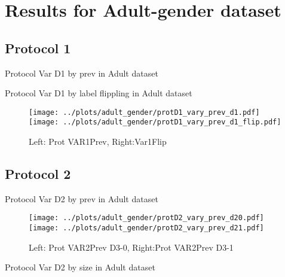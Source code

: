 \documentclass[10pt,a4paper]{article}
\begin{document}
\section{Results for Adult-gender dataset}

\subsection{Protocol 1}

\begin{table}[h!]
\small

\caption{Protocol Var D1 by prev in Adult dataset}
\end{table}

\begin{table}[h!]
\small

\caption{Protocol Var D1 by label flippling in Adult dataset}
\end{table}

\begin{figure}[h!]
\texttt{[image: ../plots/adult\_gender/protD1\_vary\_prev\_d1.pdf]}
\texttt{[image: ../plots/adult\_gender/protD1\_vary\_prev\_d1\_flip.pdf]}
\caption{Left: Prot VAR1Prev, Right:Var1Flip}
\end{figure}

\clearpage
\newpage
\subsection{Protocol 2}

\begin{table}[h!]
\small

\caption{Protocol Var D2 by prev in Adult dataset}
\end{table}

\begin{figure}[h!]
\texttt{[image: ../plots/adult\_gender/protD2\_vary\_prev\_d20.pdf]}
\texttt{[image: ../plots/adult\_gender/protD2\_vary\_prev\_d21.pdf]}
\caption{Left: Prot VAR2Prev D3-0, Right:Prot VAR2Prev D3-1}
\end{figure}

\begin{table}[h!]
\small

\caption{Protocol Var D2 by size in Adult dataset}
\end{table}
\end{document}
